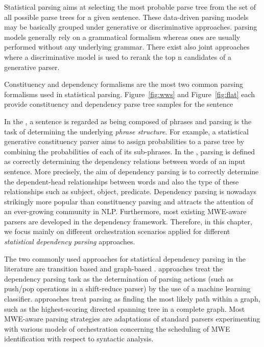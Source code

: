 \documentclass[output=paper]{LSP/langsci}
\begin{document}
Statistical parsing aims at selecting the most probable parse tree from the set of all possible parse trees for a given sentence. 
These data-driven parsing models may be basically grouped under generative or discriminative approaches.
 parsing models generally rely on a grammatical formalism whereas  ones are usually performed without any underlying grammar.
There exist also joint approaches where a discriminative model is used to rerank the top n candidates of a generative parser.

Constituency and dependency formalisms are the most two common parsing formalisms used in statistical parsing.
Figure~\ref{fig:wws} and Figure~\ref{fig:flat} each provide constituency and dependency parse tree samples
for the sentence  

In the , a sentence is regarded as being composed of phrases and parsing is the task of determining the underlying \emph{phrase structure}.
For example, a statistical generative constituency parser aims to assign probabilities to a parse tree by combining the probabilities of each of its sub-phrases.
In the , parsing is defined as correctly determining the dependency relations between words of an input sentence. More precisely,
the aim of dependency parsing is to correctly determine the dependent-head relationships between words and also the type of these relationships such as subject, object, predicate.
Dependency parsing is nowadays strikingly more popular than constituency parsing and attracts the attention of an ever-growing community in NLP.
Furthermore, most existing MWE-aware parsers are developed in the dependency framework.
Therefore, in this chapter, we focus mainly on different orchestration scenarios applied for different \emph{statistical dependency parsing} approaches.


The two commonly used approaches for statistical dependency parsing in the literature are transition based \citep{yamada2003statistical,nivre2007maltparser} and graph-based \citep{eisner1996three,mcdonald-lerman-pereira:2006:conll-x,nakagawa:2007:emnlp-conll2007}. 
 approaches treat the dependency parsing task as the determination of parsing actions (such as push/pop operations in a shift-reduce parser) by the use of a machine learning classifier.  approaches treat parsing as finding the most likely path within a graph, such as the highest-scoring directed spanning tree in a complete graph. Most MWE-aware parsing strategies are adaptations of standard parsers experimenting with various models of orchestration concerning the scheduling of MWE identification with respect to syntactic analysis.
\end{document}
